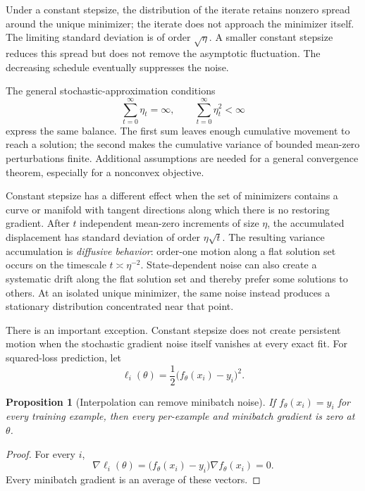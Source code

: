 \documentclass[11pt,twoside]{article}
\newtheorem{proposition}[theorem]{Proposition}
\theoremstyle{definition}
\theoremstyle{remark}
\begin{document}
Under a constant stepsize, the distribution of the iterate retains nonzero
spread around the unique minimizer; the iterate does not approach the
minimizer itself. The limiting standard deviation is of order $\sqrt{\eta}$.
A smaller constant stepsize reduces this spread but does not remove the
asymptotic fluctuation. The decreasing schedule eventually suppresses the
noise.

The general stochastic-approximation conditions
\begin{equation}
 \sum_{t=0}^\infty\eta_t=\infty,
 \qquad
 \sum_{t=0}^\infty\eta_t^2<\infty
 \label{eq:robbins-monro-steps}
\end{equation}
express the same balance. The first sum leaves enough cumulative movement to
reach a solution; the second makes the cumulative variance of bounded
mean-zero perturbations finite. Additional assumptions are needed for a
general convergence theorem, especially for a nonconvex objective.

Constant stepsize has a different effect when the set of minimizers contains a
curve or manifold with tangent directions along which there is no restoring
gradient. After $t$ independent mean-zero increments of size $\eta$, the
accumulated displacement has standard deviation of order $\eta\sqrt{t}$.
The resulting variance accumulation is \emph{diffusive behavior}: order-one motion
along a flat solution set occurs on the timescale $t\asymp\eta^{-2}$.
State-dependent noise can also create a systematic drift along the flat solution set and
thereby prefer some solutions to others. At an isolated unique minimizer,
the same noise instead produces a stationary distribution concentrated near
that point.

There is an important exception. Constant stepsize does not create persistent
motion when the stochastic gradient noise itself vanishes at every exact fit.
For squared-loss prediction, let
\[
 \ell_i(\theta)=\frac12\bigl(f_\theta(x_i)-y_i\bigr)^2.
\]

\begin{proposition}[Interpolation can remove minibatch noise]
\label{prop:interpolation-removes-noise}
If $f_\theta(x_i)=y_i$ for every training example, then every per-example and
minibatch gradient is zero at $\theta$.
\end{proposition}

\begin{proof}
For every $i$,
\[
 \nabla\ell_i(\theta)
 =\bigl(f_\theta(x_i)-y_i\bigr)\nabla f_\theta(x_i)=0.
\]
Every minibatch gradient is an average of these vectors.
\end{proof}
\end{document}
